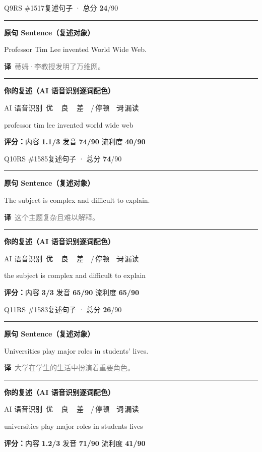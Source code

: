 \documentclass[11pt]{article}
\newcommand{\sfull}[1]{\textcolor{cFix}{\bfseries #1}}     %
\newcommand{\spart}[1]{\textcolor{cPartial}{\bfseries #1}} %
\newcommand{\ptesub}[1]{%
  \par\needspace{2\baselineskip}\smallskip
  {\color{cAccent}\rule[-0.2ex]{3pt}{1.05em}}\hspace{6pt}%
  {\bfseries\color{cHead}#1}\par\nopagebreak\smallskip}
\newcommand{\sg}[1]{\textcolor{cSpkGood}{#1}}   %
\newcommand{\sy}[1]{\textcolor{cSpkOk}{#1}}     %
\newcommand{\sr}[1]{\textcolor{cSpkBad}{#1}}    %
\newcommand{\asrlegend}{{\footnotesize\color{gray}AI 语音识别\quad
  {\color{cSpkGood}\textbullet}\,优\ \ {\color{cSpkOk}\textbullet}\,良\ \
  {\color{cSpkBad}\textbullet}\,差\ \ {\color{gray}/}\,停顿\ \
  {\color{cSpkBad}\sout{词}}\,漏读}}
\newcommand{\zh}[1]{{\footnotesize\textcolor{cNote}{\textbf{译}}\ \textcolor{gray}{#1}}}
\begin{document}
\begin{qblock}{Q9\quad RS \#1517}{复述句子 · 总分 \textcolor{cAccent}{\bfseries 24}/90}
\ptesub{原句 Sentence（复述对象）}
\begin{promptbox}
Professor Tim Lee invented World Wide Web.
\end{promptbox}
\zh{蒂姆·李教授发明了万维网。}
\ptesub{你的复述（AI 语音识别逐词配色）}
\asrlegend
\begin{asrbox}
\sg{professor} \sg{tim} \sy{lee} \sr{invented} \sg{world} \sg{wide} \sg{web}
\end{asrbox}
\smallskip
{\small\textbf{评分：}内容 \spart{1.1/3} \quad\textperiodcentered\quad 发音 \sfull{74/90} \quad\textperiodcentered\quad 流利度 \spart{40/90}}
\end{qblock}

\begin{qblock}{Q10\quad RS \#1585}{复述句子 · 总分 \textcolor{cAccent}{\bfseries 74}/90}
\ptesub{原句 Sentence（复述对象）}
\begin{promptbox}
The subject is complex and difficult to explain.
\end{promptbox}
\zh{这个主题复杂且难以解释。}
\ptesub{你的复述（AI 语音识别逐词配色）}
\asrlegend
\begin{asrbox}
\sg{the} \sg{subject} \sg{is} \sg{complex} \sg{and} \sg{difficult} \sg{to} \sg{explain}
\end{asrbox}
\smallskip
{\small\textbf{评分：}内容 \sfull{3/3} \quad\textperiodcentered\quad 发音 \sfull{65/90} \quad\textperiodcentered\quad 流利度 \sfull{65/90}}
\end{qblock}

\begin{qblock}{Q11\quad RS \#1583}{复述句子 · 总分 \textcolor{cAccent}{\bfseries 26}/90}
\ptesub{原句 Sentence（复述对象）}
\begin{promptbox}
Universities play major roles in students' lives.
\end{promptbox}
\zh{大学在学生的生活中扮演着重要角色。}
\ptesub{你的复述（AI 语音识别逐词配色）}
\asrlegend
\begin{asrbox}
\sg{universities} \sr{play} \sg{major} \sr{roles} \sg{in} \sg{students} \sg{lives}
\end{asrbox}
\smallskip
{\small\textbf{评分：}内容 \spart{1.2/3} \quad\textperiodcentered\quad 发音 \sfull{71/90} \quad\textperiodcentered\quad 流利度 \spart{41/90}}\quad{\footnotesize\color{gray}（录音 0:15）}
\end{qblock}
\end{document}
